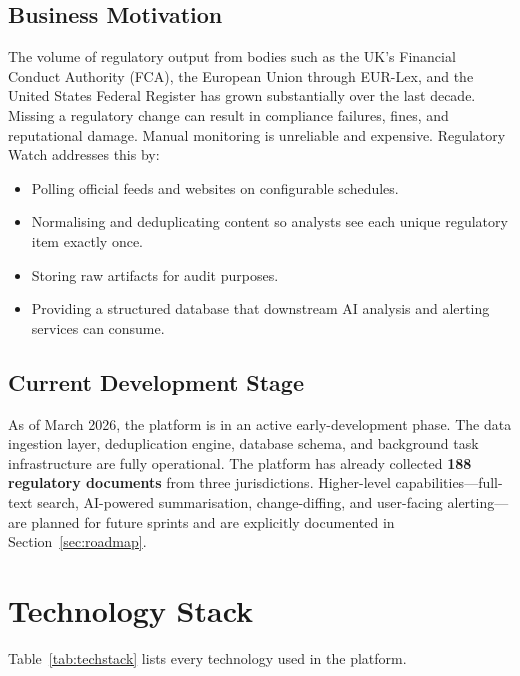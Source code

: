 \documentclass[12pt,a4paper]{article}
\begin{document}
\subsection{Business Motivation}

The volume of regulatory output from bodies such as the UK's Financial Conduct Authority (FCA), the European Union through EUR-Lex, and the United States Federal Register has grown substantially over the last decade. Missing a regulatory change can result in compliance failures, fines, and reputational damage. Manual monitoring is unreliable and expensive. Regulatory Watch addresses this by:

\begin{itemize}[noitemsep]
  \item Polling official feeds and websites on configurable schedules.
  \item Normalising and deduplicating content so analysts see each unique regulatory item exactly once.
  \item Storing raw artifacts for audit purposes.
  \item Providing a structured database that downstream AI analysis and alerting services can consume.
\end{itemize}

\subsection{Current Development Stage}

As of March 2026, the platform is in an active early-development phase. The data ingestion layer, deduplication engine, database schema, and background task infrastructure are fully operational. The platform has already collected \textbf{188 regulatory documents} from three jurisdictions. Higher-level capabilities—full-text search, AI-powered summarisation, change-diffing, and user-facing alerting—are planned for future sprints and are explicitly documented in Section~\ref{sec:roadmap}.

\section{Technology Stack}

Table~\ref{tab:techstack} lists every technology used in the platform.
\end{document}
